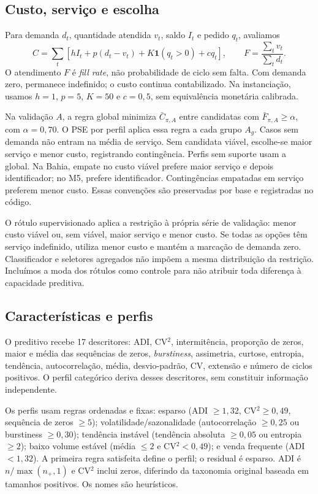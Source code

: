 \documentclass[preprint,12pt]{elsarticle}
\begin{document}
\subsection{Custo, serviço e escolha}
Para demanda $d_t$, quantidade atendida $v_t$, saldo $I_t$ e pedido $q_t$, avaliamos
\begin{equation}
 C=\sum_t[hI_t+p(d_t-v_t)+K\mathbf1(q_t>0)+cq_t],
 \qquad F=\frac{\sum_t v_t}{\sum_t d_t}.
 \label{eq:metrics}
\end{equation}
O atendimento $F$ é \textit{fill rate}, não probabilidade de ciclo sem falta. Com demanda zero, permanece indefinido; o custo continua contabilizado. Na instanciação, usamos $h=1$, $p=5$, $K=50$ e $c=0{,}5$, sem equivalência monetária calibrada.

Na validação $A$, a regra global minimiza $\bar C_{\pi,A}$ entre candidatas com $\bar F_{\pi,A}\geq\alpha$, com $\alpha=0{,}70$. O PSE por perfil aplica essa regra a cada grupo $A_g$. Casos sem demanda não entram na média de serviço. Sem candidata viável, escolhe-se maior serviço e menor custo, registrando contingência. Perfis sem suporte usam a global. Na Bahia, empate no custo viável prefere maior serviço e depois identificador; no M5, prefere identificador. Contingências empatadas em serviço preferem menor custo. Essas convenções são preservadas por base e registradas no código.

O rótulo supervisionado aplica a restrição à própria série de validação: menor custo viável ou, sem viável, maior serviço e menor custo. Se todas as opções têm serviço indefinido, utiliza menor custo e mantém a marcação de demanda zero. Classificador e seletores agregados não impõem a mesma distribuição da restrição. Incluímos a moda dos rótulos como controle para não atribuir toda diferença à capacidade preditiva.

\subsection{Características e perfis}
O preditivo recebe 17 descritores: ADI, CV$^2$, intermitência, proporção de zeros, maior e média das sequências de zeros, \textit{burstiness}, assimetria, curtose, entropia, tendência, autocorrelação, média, desvio-padrão, CV, extensão e número de ciclos positivos. O perfil categórico deriva desses descritores, sem constituir informação independente.

Os perfis usam regras ordenadas e fixas: esparso (ADI $\geq1{,}32$, CV$^2\geq0{,}49$, sequência de zeros $\geq5$); volatilidade/sazonalidade (autocorrelação $\geq0{,}25$ ou burstiness $\geq0{,}30$); tendência instável (tendência absoluta $\geq0{,}05$ ou entropia $\geq2$); baixo volume estável (média $\leq2$ e CV$^2<0{,}49$); e venda frequente (ADI $<1{,}32$). A primeira regra satisfeita define o perfil; o residual é esparso. ADI é $n/\max(n_+,1)$ e CV$^2$ inclui zeros, diferindo da taxonomia original baseada em tamanhos positivos. Os nomes são heurísticos.
\end{document}
